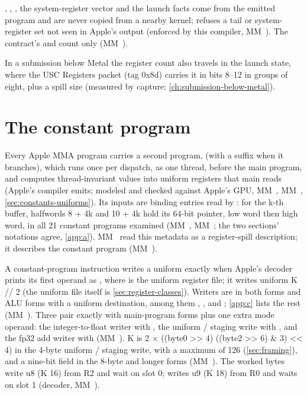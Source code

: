 , , , the system-register vector and the launch facts come from the
emitted program and are never copied from a nearby kernel;  refuses a tail or
system-register set not seen in Apple's output (enforced by this compiler, MM~). The contract's  and  count
 only (MM~).

In a submission below Metal the register count also travels in the launch state, where the USC Registers packet (tag
0x8d) carries it in bits 8--12 in groups of eight, plus a spill size (measured by capture; \cref{ch:submission-below-metal}).

\section{The constant program}\label{sec:constant-program-record}

Every Apple MMA program carries a second program,  (with a  suffix when
it branches), which runs once per dispatch, as one thread, before the main program, and computes thread-invariant values
into uniform registers that main reads (Apple's compiler emits; modeled and checked against Apple's GPU, MM~,
MM~, \cref{sec:constants-uniforms}). Its inputs are binding entries read by : for the k-th buffer,
halfwords 8 + 4k and 10 + 4k hold its 64-bit pointer, low word then high word, in all 21 constant programs examined
(MM~, MM~; the two sections' notations agree, \cref{app:a}). MM~ read this metadata as a
register-spill description; it describes the constant program (MM~).

A constant-program instruction writes a uniform exactly when Apple's decoder
prints its first operand as , where  is the uniform register file; it writes uniform
K // 2 (the uniform file itself is \cref{sec:register-classes}). Writers are  in both forms and ALU forms
with a uniform destination, among them , ,  and ; \cref{app:c} lists the rest (MM~). Three pair exactly with main-program forms
plus one extra mode operand: the integer-to-float writer with , the uniform / staging
write with , and the fp32 add writer with 
(MM~). K is 2 $\times$ ((byte0 >{}> 4) \textbar{} ((byte2 >{}> 6) \& 3) <{}< 4) in the 4-byte uniform / staging write, with a maximum of 126 (\cref{sec:framing}), and a nine-bit field in the 8-byte and longer forms (MM~). The
worked bytes 
write u8 (K 16) from R2 and wait on slot 0;  writes u9 (K 18) from R0 and waits on slot 1 (decoder,
MM~).

